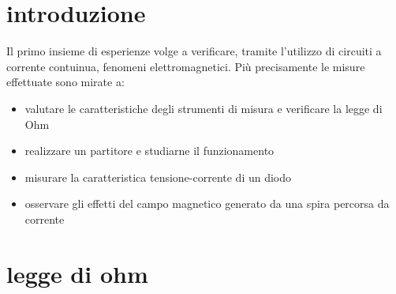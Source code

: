 \documentclass[a4paper]{article}
\begin{document}
\section{introduzione}
Il primo insieme di esperienze volge a verificare, tramite l'utilizzo di circuiti a 
corrente contuinua, fenomeni elettromagnetici. Più precisamente le misure effettuate sono mirate a:
\begin{itemize}
    \item valutare le caratteristiche degli strumenti di misura e verificare la legge di Ohm
    \item realizzare un partitore e studiarne il funzionamento
    \item misurare la caratteristica tensione-corrente di un diodo
    \item osservare gli effetti del campo magnetico generato da una spira percorsa da corrente

\end{itemize}
\section{legge di ohm}


\subsection{}
\end{document}
